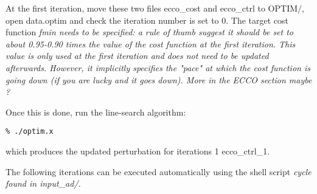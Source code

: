 At the first iteration, move these two files ecco\_cost and ecco\_ctrl 
to OPTIM/, open data.optim and check the iteration number is set to 0.
The target cost function \it{fmin} needs to be specified: a rule of thumb 
suggest it should be set to about 0.95-0.90 times the value of the cost
function at the first iteration. This value is only used at the first
iteration and does not need to be updated afterwards. 
However, it implicitly specifies the "pace" at which the cost function is
going down (if you are lucky and it goes down). More in the ECCO section maybe ?

Once this is done, run the line-search algorithm:
\begin{verbatim}
% ./optim.x
\end{verbatim}
which produces the updated perturbation for iterations 1 ecco\_ctrl\_1.

The following iterations can be executed automatically using the shell script \it{cycle}
found in input\_ad/.

